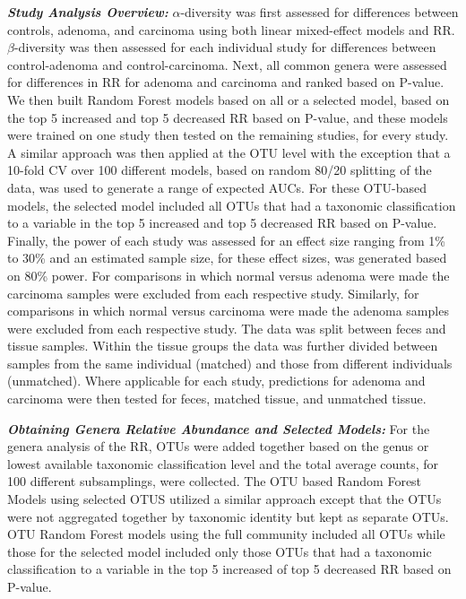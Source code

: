\documentclass[12pt,]{article}
\begin{document}
\textbf{\emph{Study Analysis Overview:}} \(\alpha\)-diversity was first
assessed for differences between controls, adenoma, and carcinoma using
both linear mixed-effect models and RR. \(\beta\)-diversity was then
assessed for each individual study for differences between
control-adenoma and control-carcinoma. Next, all common genera were
assessed for differences in RR for adenoma and carcinoma and ranked
based on P-value. We then built Random Forest models based on all or a
selected model, based on the top 5 increased and top 5 decreased RR
based on P-value, and these models were trained on one study then tested
on the remaining studies, for every study. A similar approach was then
applied at the OTU level with the exception that a 10-fold CV over 100
different models, based on random 80/20 splitting of the data, was used
to generate a range of expected AUCs. For these OTU-based models, the
selected model included all OTUs that had a taxonomic classification to
a variable in the top 5 increased and top 5 decreased RR based on
P-value. Finally, the power of each study was assessed for an effect
size ranging from 1\% to 30\% and an estimated sample size, for these
effect sizes, was generated based on 80\% power. For comparisons in
which normal versus adenoma were made the carcinoma samples were
excluded from each respective study. Similarly, for comparisons in which
normal versus carcinoma were made the adenoma samples were excluded from
each respective study. The data was split between feces and tissue
samples. Within the tissue groups the data was further divided between
samples from the same individual (matched) and those from different
individuals (unmatched). Where applicable for each study, predictions
for adenoma and carcinoma were then tested for feces, matched tissue,
and unmatched tissue.

\textbf{\emph{Obtaining Genera Relative Abundance and Selected Models:}}
For the genera analysis of the RR, OTUs were added together based on the
genus or lowest available taxonomic classification level and the total
average counts, for 100 different subsamplings, were collected. The OTU
based Random Forest Models using selected OTUS utilized a similar
approach except that the OTUs were not aggregated together by taxonomic
identity but kept as separate OTUs. OTU Random Forest models using the
full community included all OTUs while those for the selected model
included only those OTUs that had a taxonomic classification to a
variable in the top 5 increased of top 5 decreased RR based on P-value.
\end{document}
